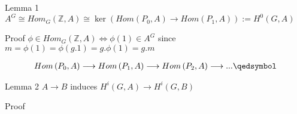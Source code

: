 \documentclass[10pt,xcolor=table,dvipsnames]{beamer}
\begin{document}
\begin{frame}[fragile]
        \begin{block}{Lemma 1}
        $A^{G}\cong Hom_{G}\left( \mathbb{Z},A\right) \cong \ker \left( Hom\left(
P_{0},A\right) \longrightarrow Hom\left( P_{1},A\right) \right)
:=H^{0}\left( G,A\right)$
        \end{block}
        \begin{block}{Proof}
        $\phi \in Hom_{G}\left( \mathbb{Z},A\right) \iff \phi \left( 1\right) \in
A^{G}$ since $m=\phi \left( 1\right) =\phi \left( g.1\right) =g.\phi \left(1\right) =g.m$
\begin{center}
\end{center}
\begin{gather*}
Hom\left( P_{0},A\right) \longrightarrow Hom\left( P_{1},A\right)
\longrightarrow Hom\left( P_{2},A\right) \longrightarrow ...\qedsymbol
\end{gather*}

        \end{block}
\end{frame}

\begin{frame}[fragile]
        \begin{block}{Lemma 2}
        $A \longrightarrow B$ induces $H^i\left( G,A\right) \longrightarrow H^i\left(G,B\right) $
        \end{block}
        \begin{block}{Proof}
        \begin{center}
\end{center}

        \end{block}
\end{frame}
\end{document}

